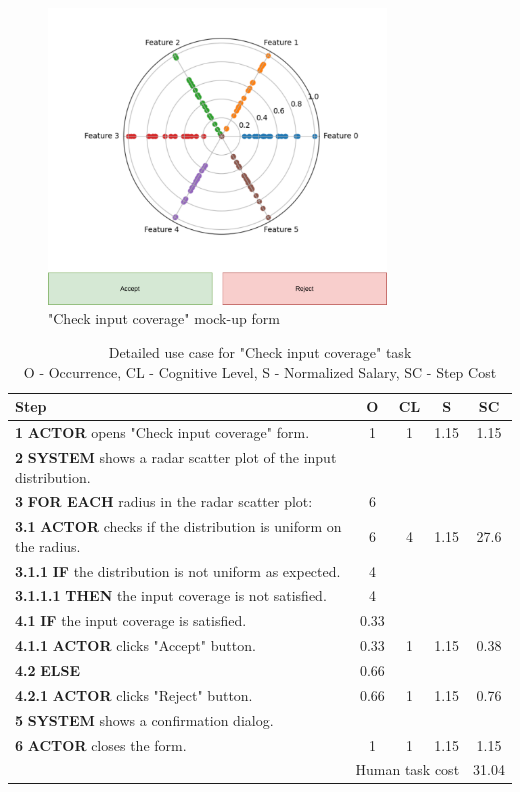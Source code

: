 \begin{figure}[H]
\centering
\includegraphics[width=0.8\textwidth]{figures/check_input_coverage.pdf}
\caption{"Check input coverage" mock-up form}
\end{figure}

\begin{table}[H]
\centering
\begin{tabularx}{\textwidth}{|X|c|c|c|c|}
\hline
\textbf{Step} & \textbf{O} & \textbf{CL} & \textbf{S} & \textbf{SC} \\
\hline
\textbf{1} \textbf{ACTOR} opens "Check input coverage" form. & 1 & 1 & 1.15 & 1.15 \\
\hline
\textbf{2} \textbf{SYSTEM} shows a radar scatter plot of the input distribution. & & & & \\
\hline
\textbf{3} \textbf{FOR EACH} radius in the radar scatter plot: & 6 & & & \\
\hline
\textbf{3.1} \textbf{ACTOR} checks if the distribution is uniform on the radius. & 6 & 4 & 1.15 & 27.6 \\
\hline
\textbf{3.1.1} \textbf{IF} the distribution is not uniform as expected. & 4 & & & \\
\hline
\textbf{3.1.1.1} \textbf{THEN} the input coverage is not satisfied. & 4 & & & \\
\hline
\textbf{4.1} \textbf{IF} the input coverage is satisfied. & 0.33 & & & \\
\hline
\textbf{4.1.1} \textbf{ACTOR} clicks "Accept" button. & 0.33 & 1 & 1.15 & 0.38 \\
\hline
\textbf{4.2} \textbf{ELSE} & 0.66 & & & \\
\hline
\textbf{4.2.1} \textbf{ACTOR} clicks "Reject" button. & 0.66 & 1 & 1.15 & 0.76 \\
\hline
\textbf{5} \textbf{SYSTEM} shows a confirmation dialog. & & & & \\
\hline
\textbf{6} \textbf{ACTOR} closes the form. & 1 & 1 & 1.15 & 1.15 \\
\hline
\multicolumn{4}{|r|}{Human task cost} & 31.04 \\
\hline
\end{tabularx}
\caption{Detailed use case for "Check input coverage" task\\ 
O - Occurrence, CL - Cognitive Level, S - Normalized Salary, SC - Step Cost}
\label{table:check_input_coverage}
\end{table}

